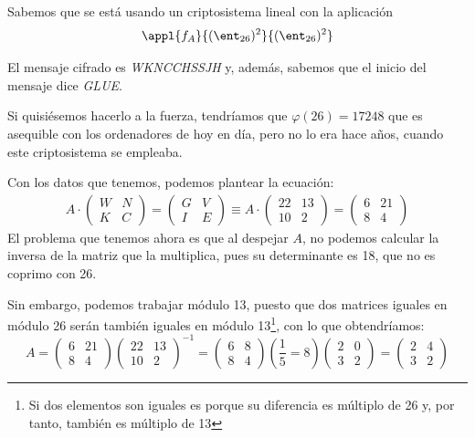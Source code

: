 \begin{example}
Sabemos que se está usando un criptosistema lineal con la aplicación
\[\appl{f_A}{(\ent_{26})^2}{(\ent_{26})^2}\]

El mensaje cifrado es \textit{WKNCCHSSJH} y, además, sabemos que el inicio del mensaje dice \textit{GLUE}.

Si quisiésemos hacerlo a la fuerza, tendríamos que $\varphi(26) = 17248$ que es asequible con los ordenadores de hoy en día, pero no lo era hace años, cuando este criptosistema se empleaba.

Con los datos que tenemos, podemos plantear la ecuación:
\begin{eqnarray}\label{equation:matrix}
A \cdot \left( \begin{array}{cc}
W & N \\
K & C  \end{array} \right) = \left( \begin{array}{cc}
G & V \\
I & E  \end{array} \right) \equiv A \cdot \left( \begin{array}{cc}
22 & 13 \\
10 & 2  \end{array} \right) = \left( \begin{array}{cc}
6 & 21 \\
8 & 4  \end{array} \right)
\end{eqnarray}
El problema que tenemos ahora es que al despejar $A$, no podemos calcular la inversa de la matriz que la multiplica, pues su determinante es 18, que no es coprimo con 26.

Sin embargo, podemos trabajar módulo 13, puesto que dos matrices iguales en módulo 26 serán también iguales en módulo 13\footnote{Si dos elementos son iguales es porque su diferencia es múltiplo de 26 y, por tanto, también es múltiplo de 13}, con lo que obtendríamos:
\[  A =  \left( \begin{array}{cc}
6 & 21 \\
8 & 4  \end{array} \right) \left( \begin{array}{cc}
22 & 13 \\
10 & 2  \end{array} \right)^{-1} = \left( \begin{array}{cc}
6 & 8 \\
8 & 4  \end{array} \right)\left(\frac{1}{5} = 8 \right) \left( \begin{array}{cc}
2 & 0 \\
3 & 2  \end{array} \right) = \left( \begin{array}{cc}
2 & 4 \\
3 & 2  \end{array} \right)\]


\end{example}
